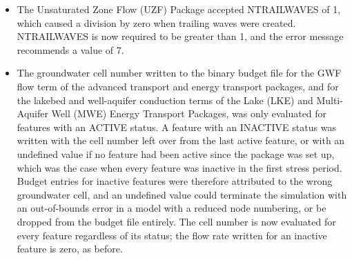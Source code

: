 \begin{itemize}
\item The Unsaturated Zone Flow (UZF) Package accepted NTRAILWAVES of 1, which caused a division by zero when trailing waves were created. NTRAILWAVES is now required to be greater than 1, and the error message recommends a value of 7.
\item The groundwater cell number written to the binary budget file for the GWF flow term of the advanced transport and energy transport packages, and for the lakebed and well-aquifer conduction terms of the Lake (LKE) and Multi-Aquifer Well (MWE) Energy Transport Packages, was only evaluated for features with an ACTIVE status. A feature with an INACTIVE status was written with the cell number left over from the last active feature, or with an undefined value if no feature had been active since the package was set up, which was the case when every feature was inactive in the first stress period. Budget entries for inactive features were therefore attributed to the wrong groundwater cell, and an undefined value could terminate the simulation with an out-of-bounds error in a model with a reduced node numbering, or be dropped from the budget file entirely. The cell number is now evaluated for every feature regardless of its status; the flow rate written for an inactive feature is zero, as before.
\end{itemize}

